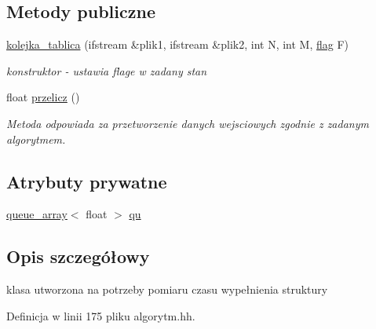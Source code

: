 \subsection*{\-Metody publiczne}
\begin{DoxyCompactItemize}
\item 
\hyperlink{classkolejka__tablica_aa99b89749fcd8c780882ebbe089cad0f}{kolejka\-\_\-tablica} (ifstream \&plik1, ifstream \&plik2, int \-N, int \-M, \hyperlink{stos_8hh_a7847560c748814fd3070e9149a9578bd}{flag} \-F)
\begin{DoxyCompactList}\small\item\em konstruktor -\/ ustawia flage w zadany stan \end{DoxyCompactList}\item 
float \hyperlink{classkolejka__tablica_aad6baa28ce61111666e70df7d6ac4f86}{przelicz} ()
\begin{DoxyCompactList}\small\item\em \-Metoda odpowiada za przetworzenie danych wejsciowych zgodnie z zadanym algorytmem. \end{DoxyCompactList}\end{DoxyCompactItemize}
\subsection*{\-Atrybuty prywatne}
\begin{DoxyCompactItemize}
\item 
\hyperlink{classqueue__array}{queue\-\_\-array}$<$ float $>$ \hyperlink{classkolejka__tablica_a7fd15c7c7a0fa3649042ec634b2b8d4f}{qu}
\end{DoxyCompactItemize}


\subsection{\-Opis szczegółowy}
klasa utworzona na potrzeby pomiaru czasu wypełnienia struktury 

\-Definicja w linii 175 pliku algorytm.\-hh.




